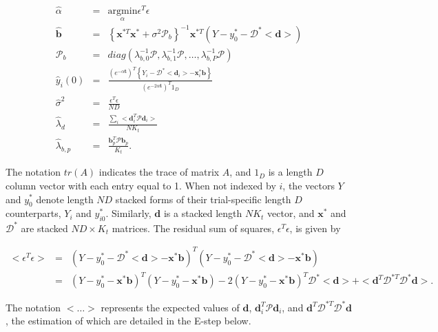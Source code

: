 \documentclass[preprint]{JASA}
\begin{document}
\begin{eqnarray*}
\hat{\alpha} &=& \underset{\alpha}{\mathrm{argmin }}\epsilon^T\epsilon\\[5mm]
\widehat{\mathbf{b}} &=& \left\{\mathbf{x}^{*T}\mathbf{x}^* + \sigma^2\mathcal{P}_b \right\}^{-1}\mathbf{x}^{*T}\left(Y - y_{0}^* - \bm{\mathcal{D}}^*<\mathbf{d}> \right)\\[5mm]
\mathcal{P}_b &=& diag\left(\lambda_{b, 0}^{-1}\mathcal{P}, \lambda_{b, 1}^{-1}\mathcal{P}, \ldots,  \lambda_{b, P}^{-1}\mathcal{P} \right)\\[5mm]
\widehat{y}_i(0) &=& \frac{(e^{-\alpha\mathbf{t}} )^T \left\{Y_i -  \mathcal{D}^*<\mathbf{d}_i> - \mathbf{x}_i^*\mathbf{b} \right\}}{(e^{-2\alpha\mathbf{t}})^T 1_{D}}\\[5mm]
\widehat{\sigma}^2 &=& \frac{\epsilon^T\epsilon}{ND}\\[5mm]
\widehat{\lambda}_d &=& \frac{\sum_i <\mathbf{d}_i^T\mathcal{P}\mathbf{d}_i>}{NK_t}\\[5mm]
\widehat{\lambda}_{b, p} &=&\frac{ \mathbf{b}_p^T\mathcal{P}\mathbf{b}_p}{K_t}.
\end{eqnarray*}

\noindent The notation \(tr(A)\) indicates the trace of matrix \(A\),
and \(1_{D}\) is a length \(D\) column vector with each entry equal to
1. When not indexed by \(i\), the vectors \(Y\) and \(y_0^*\) denote
length \(ND\) stacked forms of their trial-specific length \(D\)
counterparts, \(Y_i\) and \(y_{i0}^*\). Similarly, \(\mathbf{d}\) is a
stacked length \(NK_t\) vector, and \(\mathbf{x}^*\) and
\(\bm{\mathcal{D}}^*\) are stacked \(ND \times K_t\) matrices. The
residual sum of squares, \(\epsilon^T\epsilon\), is given by

\begin{eqnarray*}
<\epsilon^T\epsilon> &=& (Y- y_{0}^* - \bm{\mathcal{D}}^*<\mathbf{d}> -  \mathbf{x}^*\mathbf{b})^T(Y - y_{0}^* - \bm{\mathcal{D}}^*<\mathbf{d}> -  \mathbf{x}^*\mathbf{b})\\
&=& (Y- y_{0}^* -\mathbf{x}^*\mathbf{b})^T(Y- y_{0}^* -\mathbf{x}^*\mathbf{b}) - 2(Y- y_{0}^* -\mathbf{x}^*\mathbf{b})^T\bm{\mathcal{D}}^*<\mathbf{d}> +<\mathbf{d}^T\bm{\mathcal{D}}^{*T}\bm{\mathcal{D}}^*\mathbf{d}>.
\end{eqnarray*}

\noindent The notation \(<\ldots>\) represents the expected values of
\(\mathbf{d}\), \(\mathbf{d}_i^T\mathcal{P}\mathbf{d}_i\), and
\(\mathbf{d}^T\mathcal{D}^{*T}\mathcal{D}^*\mathbf{d}\), the estimation
of which are detailed in the E-step below.
\end{document}
